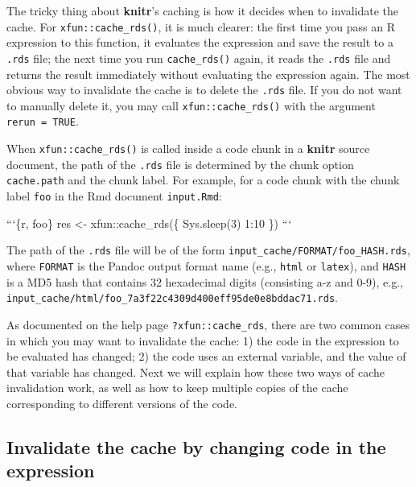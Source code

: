 \documentclass[
  11pt,
]{krantz}
\newenvironment{Shaded}{\begin{snugshade}}{\end{snugshade}}
\newcommand{\BaseNTok}[1]{\textcolor[rgb]{0.06,0.06,0.06}{#1}}
\begin{document}
The tricky thing about \textbf{knitr}'s caching is how it decides when to invalidate the cache. For \texttt{xfun::cache\_rds()}, it is much clearer: the first time you pass an R expression to this function, it evaluates the expression and save the result to a \texttt{.rds} file; the next time you run \texttt{cache\_rds()} again, it reads the \texttt{.rds} file and returns the result immediately without evaluating the expression again. The most obvious way to invalidate the cache is to delete the \texttt{.rds} file. If you do not want to manually delete it, you may call \texttt{xfun::cache\_rds()} with the argument \texttt{rerun\ =\ TRUE}.

When \texttt{xfun::cache\_rds()} is called inside a code chunk in a \textbf{knitr} source document, the path of the \texttt{.rds} file is determined by the chunk option \texttt{cache.path} and the chunk label. For example, for a code chunk with the chunk label \texttt{foo} in the Rmd document \texttt{input.Rmd}:

\begin{Shaded}
\begin{Highlighting}[]
\BaseNTok{```\{r, foo\}}
\BaseNTok{res <- xfun::cache_rds(\{}
\BaseNTok{  Sys.sleep(3)}
\BaseNTok{  1:10}
\BaseNTok{\})}
\BaseNTok{```}
\end{Highlighting}
\end{Shaded}

The path of the \texttt{.rds} file will be of the form \texttt{input\_cache/FORMAT/foo\_HASH.rds}, where \texttt{FORMAT} is the Pandoc output format name (e.g., \texttt{html} or \texttt{latex}), and \texttt{HASH} is a MD5 hash that contains 32 hexadecimal digits (consisting a-z and 0-9), e.g., \texttt{input\_cache/html/foo\_7a3f22c4309d400eff95de0e8bddac71.rds}.

As documented on the help page \texttt{?xfun::cache\_rds}, there are two common cases in which you may want to invalidate the cache: 1) the code in the expression to be evaluated has changed; 2) the code uses an external variable, and the value of that variable has changed. Next we will explain how these two ways of cache invalidation work, as well as how to keep multiple copies of the cache corresponding to different versions of the code.

\hypertarget{invalidate-the-cache-by-changing-code-in-the-expression}{%
\subsection{Invalidate the cache by changing code in the expression}\label{invalidate-the-cache-by-changing-code-in-the-expression}}
\end{document}
